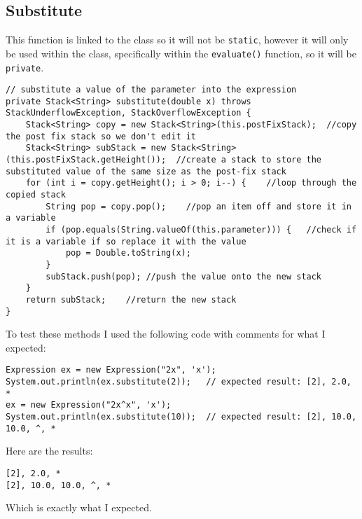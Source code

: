 \documentclass[../../../../main.tex]{subfiles}
\begin{document}
\subsection{Substitute}
This function is linked to the class so it will not be \texttt{static}, however it will only be used within the class, specifically within the \texttt{evaluate()} function, so it will be \texttt{private}.
\begin{verbatim}
// substitute a value of the parameter into the expression
private Stack<String> substitute(double x) throws StackUnderflowException, StackOverflowException {
	Stack<String> copy = new Stack<String>(this.postFixStack);	//copy the post fix stack so we don't edit it
	Stack<String> subStack = new Stack<String>(this.postFixStack.getHeight());	//create a stack to store the substituted value of the same size as the post-fix stack
	for (int i = copy.getHeight(); i > 0; i--) {	//loop through the copied stack
		String pop = copy.pop();	//pop an item off and store it in a variable
		if (pop.equals(String.valueOf(this.parameter))) {	//check if it is a variable if so replace it with the value
			pop = Double.toString(x);
		}
		subStack.push(pop);	//push the value onto the new stack 
	}
	return subStack;	//return the new stack
}
\end{verbatim}
To test these methods I used the following code with comments for what I expected:
\begin{verbatim}
Expression ex = new Expression("2x", 'x');
System.out.println(ex.substitute(2));	// expected result: [2], 2.0, *
ex = new Expression("2x^x", 'x');
System.out.println(ex.substitute(10));	// expected result: [2], 10.0, 10.0, ^, *
\end{verbatim}
Here are the results:
\begin{verbatim}
[2], 2.0, *
[2], 10.0, 10.0, ^, *
\end{verbatim}
Which is exactly what I expected.
\newpage
\end{document}
